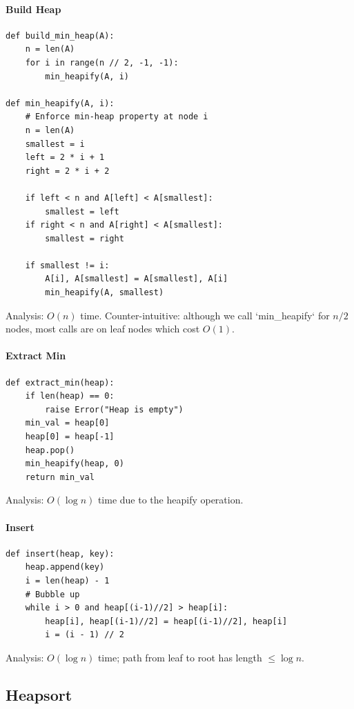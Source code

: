 \documentclass[11pt]{article}
\begin{document}
{{{\paragraph{Build Heap}
\begin{lstlisting}
def build_min_heap(A):
    n = len(A)
    for i in range(n // 2, -1, -1):
        min_heapify(A, i)

def min_heapify(A, i):
    # Enforce min-heap property at node i
    n = len(A)
    smallest = i
    left = 2 * i + 1
    right = 2 * i + 2
    
    if left < n and A[left] < A[smallest]:
        smallest = left
    if right < n and A[right] < A[smallest]:
        smallest = right
    
    if smallest != i:
        A[i], A[smallest] = A[smallest], A[i]
        min_heapify(A, smallest)
\end{lstlisting}

Analysis: $O(n)$ time. Counter-intuitive: although we call `min_heapify` for $n/2$ nodes, most calls are on leaf nodes which cost $O(1)$.

\paragraph{Extract Min}
\begin{lstlisting}
def extract_min(heap):
    if len(heap) == 0:
        raise Error("Heap is empty")
    min_val = heap[0]
    heap[0] = heap[-1]
    heap.pop()
    min_heapify(heap, 0)
    return min_val
\end{lstlisting}

Analysis: $O(\log n)$ time due to the heapify operation.

\paragraph{Insert}
\begin{lstlisting}
def insert(heap, key):
    heap.append(key)
    i = len(heap) - 1
    # Bubble up
    while i > 0 and heap[(i-1)//2] > heap[i]:
        heap[i], heap[(i-1)//2] = heap[(i-1)//2], heap[i]
        i = (i - 1) // 2
\end{lstlisting}

Analysis: $O(\log n)$ time; path from leaf to root has length $\le \log n$.

\subsection*{Heapsort}

}}}
\end{document}
